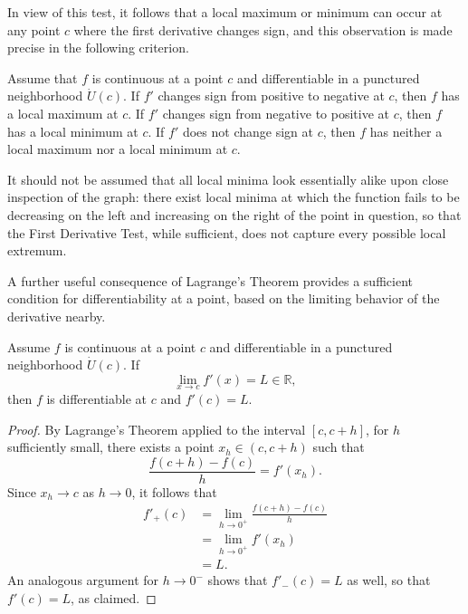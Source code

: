 In view of this test, it follows that a local maximum or minimum can occur at any point $c$ where the first derivative changes sign, and this observation is made precise in the following criterion.

\begin{theorem}
Assume that $f$ is continuous at a point $c$ and differentiable in a punctured neighborhood $\dot{U}(c)$. If $f'$ changes sign from positive to negative at $c$, then $f$ has a local maximum at $c$. If $f'$ changes sign from negative to positive at $c$, then $f$ has a local minimum at $c$. If $f'$ does not change sign at $c$, then $f$ has neither a local maximum nor a local minimum at $c$.
\end{theorem}

\begin{remark}
It should not be assumed that all local minima look essentially alike upon close inspection of the graph: there exist local minima at which the function fails to be decreasing on the left and increasing on the right of the point in question, so that the First Derivative Test, while sufficient, does not capture every possible local extremum.
\end{remark}

A further useful consequence of Lagrange's Theorem provides a sufficient condition for differentiability at a point, based on the limiting behavior of the derivative nearby.

\begin{theorem}
Assume $f$ is continuous at a point $c$ and differentiable in a punctured neighborhood $\dot{U}(c)$. If \[
\lim_{x \to c} f'(x) = L \in \mathbb{R},
\] then $f$ is differentiable at $c$ and $f'(c) = L$.
\end{theorem}

\begin{proof}
By Lagrange's Theorem applied to the interval $[c, c+h]$, for $h$ sufficiently small, there exists a point $x_h \in (c, c+h)$ such that
\[
\frac{f(c+h) - f(c)}{h} = f'(x_h).
\]
Since $x_h \to c$ as $h \to 0$, it follows that
\[
\begin{aligned}
f'_+(c) &= \lim_{h \to 0^+} \frac{f(c+h) - f(c)}{h} \\
&= \lim_{h \to 0^+} f'(x_h) \\
&= L.
\end{aligned}
\]
An analogous argument for $h \to 0^-$ shows that $f'_-(c) = L$ as well, so that $f'(c) = L$, as claimed.
\end{proof}

